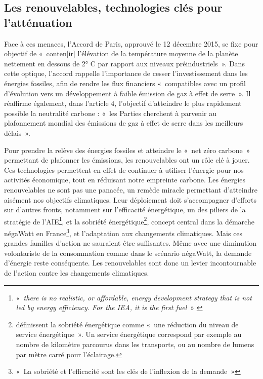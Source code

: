 \subsection{Les renouvelables, technologies clés pour l'atténuation}
Face à ces menaces, l’Accord de Paris, approuvé le 12 décembre 2015, se fixe pour objectif de «~conten[ir] l’élévation de la température moyenne de la planète nettement en dessous de 2° C par rapport aux niveaux préindustriels~». 
Dans cette optique, l’accord rappelle l’importance de cesser l’investissement dans les énergies fossiles, afin de rendre les flux financiers «~compatibles avec un profil d’évolution vers un développement à faible émission de gaz à effet de serre~». Il réaffirme également, dans l’article 4, l’objectif d’atteindre le plus rapidement possible la neutralité carbone : «~les Parties cherchent à parvenir au plafonnement mondial des émissions de gaz à effet de serre dans les meilleurs délais ».

Pour prendre la relève des énergies fossiles et atteindre le «~net zéro carbone~» permettant de plafonner les émissions, les renouvelables ont un rôle clé à jouer. Ces technologies permettent en effet de continuer à utiliser l’énergie pour nos activités économique, tout en réduisant notre empreinte carbone.
Les énergies renouvelables ne sont pas une panacée, un remède miracle permettant d’atteindre aisément nos objectifs climatiques. Leur déploiement doit s’accompagner d’efforts sur d’autres fronts, notamment sur l’efficacité énergétique, un des piliers de la stratégie de l’AIE\footnote{« \textit{there is no realistic, or affordable, energy development strategy that is not led by energy efficiency. For the IEA, it is the first fuel}~» \citep{IEA2016Efficiency}},
et la sobriété énergétique\footnote{\citet{Giraudet2008} définissent la sobriété énergétique comme «~une réduction du niveau de service énergétique~». Un service énergétique correspond par exemple au nombre de kilomètre parcourus dans les transports, ou au nombre de lumens par mètre carré pour l'éclairage.}, concept central dans la démarche négaWatt en France\footnote{«~La sobriété et l’efficacité sont les clés de l’inflexion de la demande~»\citep{NegaWatt2017}}, et l'adaptation aux changements climatiques.
Mais ces grandes familles d’action ne sauraient être suffisantes. Même avec une diminution volontariste de la consommation comme dans le scénario négaWatt, la demande d’énergie reste conséquente. Les renouvelables sont donc un levier incontournable de l’action contre les changements climatiques.


